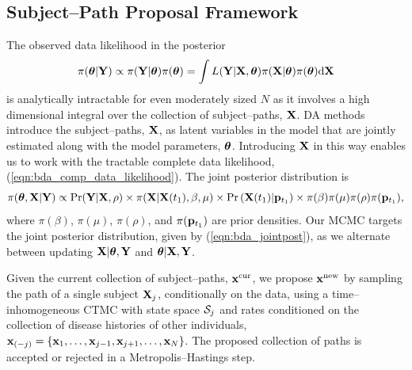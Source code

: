 \subsection{Subject--Path Proposal Framework}
\label{subsec:bda_subj_proc}
The observed data likelihood in the posterior  $$ \pi(\boldsymbol{\theta}|\mathbf{Y}) \propto \pi(\mathbf{Y}|\boldsymbol{\theta})\pi(\boldsymbol{\theta})=\int L(\mathbf{Y}|\mathbf{X}, \boldsymbol{\theta}) \pi(\mathbf{X}|\boldsymbol{\theta}) \pi(\boldsymbol{\theta}) \mathrm{d}\mathbf{X}$$
is analytically intractable for even moderately sized $ N $ as it involves a  high dimensional integral over the collection of subject--paths, $ \mathbf{X} $. DA methods introduce the subject--paths, $ \mathbf{X} $, as latent variables in the model that are jointly estimated along with the model parameters, $ \boldsymbol{\theta} $. Introducing $ \mathbf{X} $ in this way enables us to work with the tractable complete data likelihood, (\ref{eqn:bda_comp_data_likelihood}). The joint posterior distribution is \begin{equation}
\label{eqn:bda_jointpost}
\pi(\boldsymbol{\theta}, \mathbf{X}| \mathbf{Y}) \propto \Pr(\mathbf{Y}|\mathbf{X},\rho) \times\pi(\mathbf{X}|\mathbf{X}(t_1),\beta,\mu) \times \Pr\left (\mathbf{X}(t_1)|\mathbf{p}_{t_1}\right) \times\pi(\beta)\pi(\mu) \pi(\rho) \pi(\mathbf{p}_{t_1}),
\end{equation} where $ \pi(\beta)$, $\pi(\mu)$, $\pi(\rho)$, and $\pi(\mathbf{p}_{t_1}) $ are prior densities. Our MCMC targets the joint posterior distribution, given by (\ref{eqn:bda_jointpost}), as we alternate between updating $ \mathbf{X}|\boldsymbol{\theta},\mathbf{Y} $ and $ \boldsymbol{\theta}|\mathbf{X},\mathbf{Y} $. 

Given the current collection of subject--paths, $ \mathbf{x}^{\mathrm{cur}} $, we propose $ \mathbf{x}^{\mathrm{new}} $ by sampling the path of a single subject $\mathbf{X}_j$, conditionally on the data, using a time--inhomogeneous CTMC with state space $ \mathcal{S}_j  $ and rates conditioned on the collection of disease histories of other individuals, $ \mathbf{x}_{(-j)}  = \lbrace \mathbf{x}_1,\dots,\mathbf{x}_{j-1},\mathbf{x}_{j+1},\dots,\mathbf{x}_N \rbrace$. The proposed collection of paths is accepted or rejected in a Metropolis--Hastings step. 

